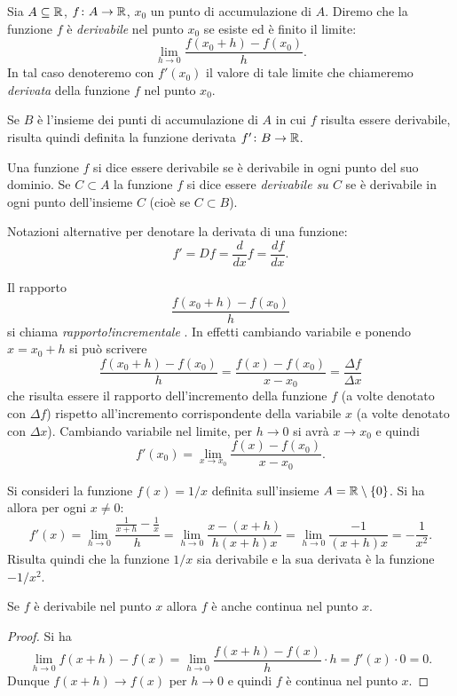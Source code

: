 \begin{definition}[derivata]
\mymark{***}%
Sia $A\subseteq {\mathbb R}$, $f\colon A \to {\mathbb R}$, $x_0$ un punto di accumulazione di $A$.
Diremo che la funzione $f$ è \emph{derivabile} nel punto $x_0$ se esiste
ed è finito il limite:
\[
  \lim_{h\to 0} \frac{f(x_0+h) - f(x_0)}{h}.
\]
In tal caso denoteremo con $f'(x_0)$ il valore di tale limite che chiameremo
\emph{derivata}%
%
 della funzione $f$ nel punto $x_0$.

Se $B$ è l'insieme dei punti di accumulazione di $A$ in cui $f$ risulta essere derivabile, risulta quindi definita la funzione derivata $f'\colon B \to {\mathbb R}$.

Una funzione $f$ si dice essere derivabile se è derivabile in ogni punto del suo dominio.
Se $C\subset A$ la funzione $f$ si dice essere \emph{derivabile su $C$} se è derivabile in ogni punto dell'insieme $C$ (cioè se $C\subset B$).

Notazioni alternative per denotare la derivata di una funzione:
\[
  f' = Df = \frac{d}{dx} f = \frac{df}{dx}.
\]
\end{definition}

Il rapporto
\[
\frac{f(x_0+h) - f(x_0)}{h}
\]
si chiama \emph{rapporto!incrementale}%
%
. In effetti cambiando variabile e ponendo $x=x_0+h$ si può scrivere
\[
\frac{f(x_0+h) - f(x_0)}{h}
= \frac{f(x) - f(x_0)}{x-x_0}
= \frac{\Delta f}{\Delta x}
\]
che risulta essere il rapporto dell'incremento della funzione $f$ (a volte denotato con $\Delta f$) rispetto all'incremento corrispondente della variabile $x$ (a volte denotato con $\Delta x$).
Cambiando variabile nel limite, per $h\to 0$ si avrà $x\to x_0$
e quindi
\[
 f'(x_0) = \lim_{x\to x_0} \frac{f(x)-f(x_0)}{x-x_0}.
\]

\begin{example}
\mymark{**}
Si consideri la funzione $f(x) = 1/x$ definita sull'insieme $A = {\mathbb R} \setminus {\left\{ 0 \right\}}$. Si ha allora per ogni $x\neq 0$:
\[
  f'(x) = \lim_{h\to 0} \frac{\frac{1}{x+h} - \frac{1}{x}}{h}
        = \lim_{h\to 0} \frac{x - (x+h)}{h(x+h)x}
        = \lim_{h\to 0} \frac{-1}{(x+h)x} = -\frac{1}{x^2}.
\]
Risulta quindi che la funzione $1/x$ sia derivabile e la sua derivata è la funzione $-1/x^2$.
\end{example}

\begin{theorem}
\mymark{***}
Se $f$ è derivabile nel punto $x$ allora $f$ è anche continua nel punto $x$.
\end{theorem}
%
\begin{proof}
\mymark{***}
Si ha
\[
  \lim_{h\to 0} f(x+h) - f(x) = \lim_{h\to 0} \frac{f(x+h) - f(x)}{h} \cdot h
  = f'(x) \cdot 0 = 0.
\]
Dunque $f(x+h)\to f(x)$ per $h\to 0$ e quindi $f$ è continua nel punto $x$.
\end{proof}

